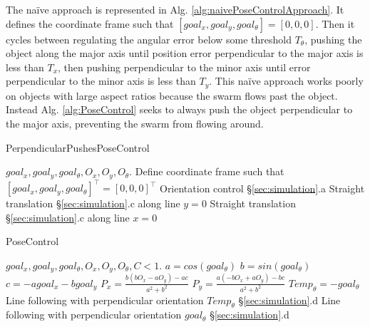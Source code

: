 The na\"{i}ve approach is represented in Alg. \ref{alg:naivePoseControlApproach}. It defines  the coordinate frame such that $[goal_x, goal_y, goal_{\theta}] = [0,0,0]$.
Then it cycles between regulating the angular error below some threshold $T_{\theta}$,
pushing the object along the major axis until position error perpendicular to the major axis is less than $T_x$, then pushing perpendicular to the minor axis until error perpendicular to the minor axis is less than $T_y$. 
This na\"{i}ve approach works poorly on objects with large aspect ratios because the swarm flows past the object. 
Instead Alg. \ref{alg:PoseControl} seeks to always push the object perpendicular to the major axis, preventing the swarm from flowing around. 


\begin{algorithm}
\caption{PerpendicularPushesPoseControl}\label{alg:naivePoseControlApproach}
\begin{algorithmic}[1]
\Require $goal_x, goal_y, goal_{\theta},O_x, O_y, O_{\theta}$.
\State Define coordinate frame such that $[goal_x, goal_y, goal_{\theta}]^\top = [0,0,0]^\top$
		\State Orientation control \S\ref{sec:simulation}.a
	\EndWhile
		\State Straight translation \S\ref{sec:simulation}.c along line $y = 0$
	\EndWhile
		\State Straight translation \S\ref{sec:simulation}.c along line $x = 0$
	\EndWhile
\EndWhile
\end{algorithmic}
\end{algorithm}



\begin{algorithm}
\caption{PoseControl}\label{alg:PoseControl}
\begin{algorithmic}[1]
\Require $goal_x, goal_y, goal_{\theta},O_x, O_y, O_{\theta}, C<1$.
\State $a = cos(goal_{\theta})$ 
\State $b = sin(goal_{\theta})$
\State $c = -a goal_x - b goal_y$
\State $P_x = \frac{b(bO_x-aO_y)-ac}{a^2 + b^2}$  
\State $P_y = \frac{a(-bO_x+aO_y)-bc}{a^2 + b^2}$
 
\State $Temp_{\theta} = -goal_{\theta}$
\State Line following with perpendicular orientation $Temp_{\theta}$ \S\ref{sec:simulation}.d
\EndWhile
\State Line following with perpendicular orientation $goal_{\theta}$ \S\ref{sec:simulation}.d
\end{algorithmic}
\end{algorithm}



